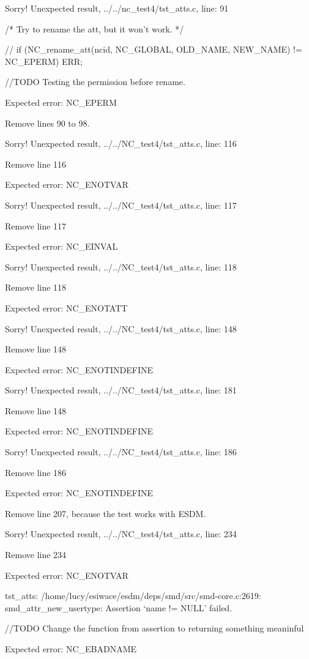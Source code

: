 Sorry! Unexpected result, ../../nc\_test4/tst\_atts.c, line: 91

/* Try to rename the att, but it won't work. */

// if (NC\_rename\_att(ncid, NC\_GLOBAL, OLD\_NAME, NEW\_NAME) != NC\_EPERM) ERR;

//TODO Testing the permission before rename.

Expected error: NC\_EPERM

Remove lines 90 to 98.

Sorry! Unexpected result, ../../NC\_test4/tst\_atts.c, line: 116

Remove line 116

Expected error: NC\_ENOTVAR

Sorry! Unexpected result, ../../NC\_test4/tst\_atts.c, line: 117

Remove line 117

Expected error: NC\_EINVAL

Sorry! Unexpected result, ../../NC\_test4/tst\_atts.c, line: 118

Remove line 118

Expected error: NC\_ENOTATT

Sorry! Unexpected result, ../../NC\_test4/tst\_atts.c, line: 148

Remove line 148

Expected error: NC\_ENOTINDEFINE

Sorry! Unexpected result, ../../NC\_test4/tst\_atts.c, line: 181

Remove line 148

Expected error: NC\_ENOTINDEFINE

Sorry! Unexpected result, ../../NC\_test4/tst\_atts.c, line: 186

Remove line 186

Expected error: NC\_ENOTINDEFINE

Remove line 207, because the test works with ESDM.

Sorry! Unexpected result, ../../NC\_test4/tst\_atts.c, line: 234

Remove line 234

Expected error: NC\_ENOTVAR

tst\_atts: /home/lucy/esiwace/esdm/deps/smd/src/smd-core.c:2619: smd\_attr\_new\_usertype: Assertion `name != NULL' failed.

//TODO Change the function from assertion to returning something meaninful

Expected error: NC\_EBADNAME

